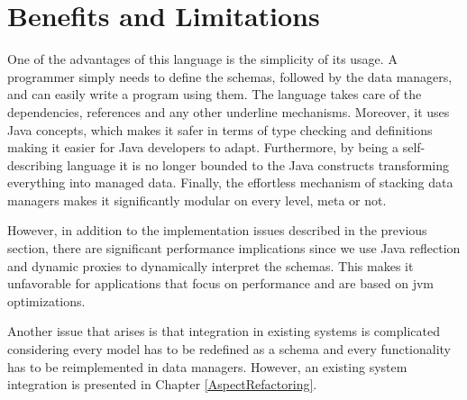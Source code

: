 \section{Benefits and Limitations}\label{Benefits and Limitations}
One of the advantages of this language is the simplicity of its usage. 
A programmer simply needs to define the schemas, followed by the data managers, and can easily write a program using them.
The language takes care of the dependencies, references and any other underline mechanisms.
Moreover, it uses Java concepts, which makes it safer in terms of type checking and definitions making it easier for Java developers to adapt.
Furthermore, by being a self-describing language it is no longer bounded to the Java constructs transforming everything into managed data.
Finally, the effortless mechanism of stacking data managers makes it significantly modular on every level, meta or not.

However, in addition to the implementation issues described in the previous section, there are significant performance implications since we use Java reflection and dynamic proxies to dynamically interpret the schemas. 
This makes it unfavorable for applications that focus on performance and are based on \ac{jvm} optimizations.

Another issue that arises is that integration in existing systems is complicated considering every model has to be redefined as a schema and every functionality has to be reimplemented in data managers.
However, an existing system integration is presented in Chapter \ref{AspectRefactoring}.

